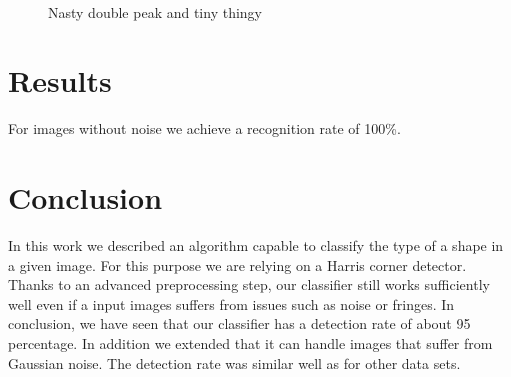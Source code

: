 \documentclass[conference]{IEEEtran}
\begin{document}
\begin{figure}%
\centering
{}
 \\
\caption{Nasty double peak and tiny thingy}

\end{figure}%

\section{Results}

For images without noise we achieve a recognition rate of 100\%. 

\section{Conclusion}
In this work we described an algorithm capable to classify the type of a shape in a given image. For this purpose we are relying on a Harris corner detector. Thanks to an advanced preprocessing step, our classifier still works sufficiently well even if a input images suffers from issues such as noise or fringes. In conclusion, we have seen that our classifier has a detection rate of about 95 percentage. In addition we extended that it can handle images that suffer from Gaussian noise. The detection rate was similar well as for other data sets.
\end{document}
